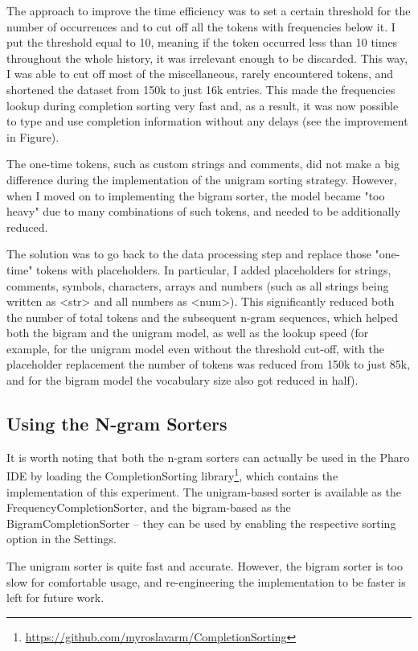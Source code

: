 \documentclass[sigplan,screen]{acmart}
\begin{document}
The approach to improve the time efficiency was to set a certain threshold for the number of occurrences and to cut off all the tokens with frequencies below it. I put the threshold equal to 10, meaning if the token occurred less than 10 times throughout the whole history, it was irrelevant enough to be discarded. This way, I was able to cut off most of the miscellaneous, rarely encountered tokens, and shortened the dataset from 150k to just 16k entries. This made the frequencies lookup during completion sorting very fast and, as a result, it was now possible to type and use completion information without any delays (see the improvement in Figure).

The one-time tokens, such as custom strings and comments, did not make a big difference during the implementation of the unigram sorting strategy. However, when I moved on to implementing the bigram sorter, the model became "too heavy" due to many combinations of such tokens, and needed to be additionally reduced.

The solution was to go back to the data processing step and replace those "one-time" tokens with placeholders. In particular, I added placeholders for strings, comments, symbols, characters, arrays and numbers (such as all strings being written as <str> and all numbers as <num>). This significantly reduced both the number of total tokens and the subsequent n-gram sequences, which helped both the bigram and the unigram model, as well as the lookup speed (for example, for the unigram model even without the threshold cut-off, with the placeholder replacement the number of tokens was reduced from 150k to just 85k, and for the bigram model the vocabulary size also got reduced in half).

\subsection{Using the N-gram Sorters}
It is worth noting that both the n-gram sorters can actually be used in the Pharo IDE by loading the CompletionSorting library\footnote{\url{https://github.com/myroslavarm/CompletionSorting}}, which contains the implementation of this experiment. The unigram-based sorter is available as the FrequencyCompletionSorter, and the bigram-based as the BigramCompletionSorter -- they can be used by enabling the respective sorting option in the Settings.

The unigram sorter is quite fast and accurate. However, the bigram sorter is too slow for comfortable usage, and re-engineering the implementation to be faster is left for future work.
\end{document}
